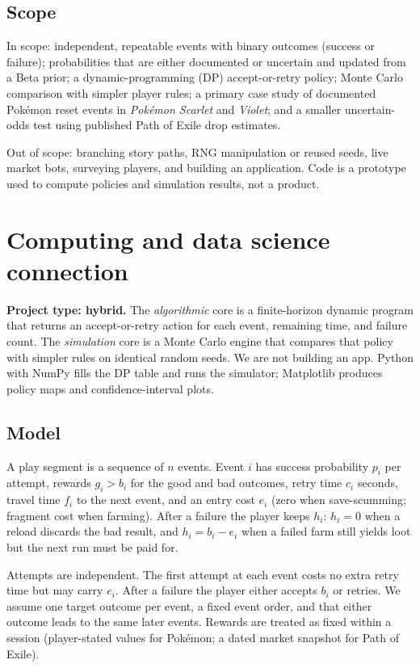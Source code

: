 \documentclass[11pt,a4paper]{article}
\begin{document}
\subsection{Scope}
In scope: independent, repeatable events with binary outcomes (success or failure); probabilities that are either documented or uncertain and updated from a Beta prior; a dynamic-programming (DP) accept-or-retry policy; Monte Carlo comparison with simpler player rules; a primary case study of documented Pok\'emon reset events in \emph{Pok\'emon Scarlet} and \emph{Violet}; and a smaller uncertain-odds test using published Path of Exile drop estimates.

Out of scope: branching story paths, RNG manipulation or reused seeds, live market bots, surveying players, and building an application. Code is a prototype used to compute policies and simulation results, not a product.

\section{Computing and data science connection}

\textbf{Project type: hybrid.}
The \emph{algorithmic} core is a finite-horizon dynamic program that returns an accept-or-retry action for each event, remaining time, and failure count. The \emph{simulation} core is a Monte Carlo engine that compares that policy with simpler rules on identical random seeds. We are not building an app. Python with NumPy fills the DP table and runs the simulator; Matplotlib produces policy maps and confidence-interval plots.

\subsection{Model}
A play segment is a sequence of \(n\) events. Event \(i\) has success probability \(p_i\) per attempt, rewards \(g_i > b_i\) for the good and bad outcomes, retry time \(c_i\) seconds, travel time \(f_i\) to the next event, and an entry cost \(e_i\) (zero when save-scumming; fragment cost when farming). After a failure the player keeps \(h_i\): \(h_i = 0\) when a reload discards the bad result, and \(h_i = b_i - e_i\) when a failed farm still yields loot but the next run must be paid for.

Attempts are independent. The first attempt at each event costs no extra retry time but may carry \(e_i\). After a failure the player either accepts \(b_i\) or retries. We assume one target outcome per event, a fixed event order, and that either outcome leads to the same later events. Rewards are treated as fixed within a session (player-stated values for Pok\'emon; a dated market snapshot for Path of Exile).
\end{document}
